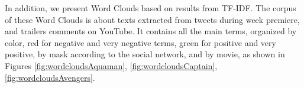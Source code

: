 In addition, we present Word Clouds based on results from TF-IDF. The corpus of these Word Clouds is about texts extracted from tweets during week premiere, and trailers comments on YouTube. It contains all the main terms, organized by color, red for negative and very negative terms, green for positive and very positive, by mask according to the social network, and by movie, as shown in Figures \ref{fig:wordcloudsAquaman}, \ref{fig:wordcloudsCaptain}, \ref{fig:wordcloudsAvengers}.





